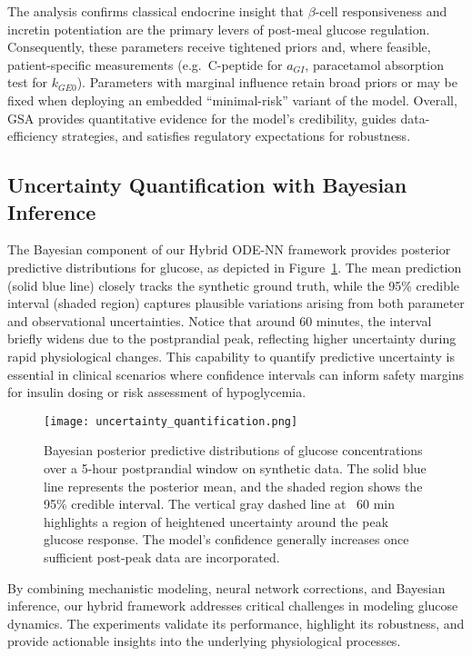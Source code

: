 \documentclass[9pt,shortpaper,twoside,web]{ieeecolor}
\begin{document}
The analysis confirms classical endocrine insight that
$\beta$-cell responsiveness and incretin potentiation are the primary
levers of post-meal glucose regulation.
Consequently, these parameters receive tightened priors and, where
feasible, patient-specific measurements (e.g.\ C-peptide for
$a_{GI}$, paracetamol absorption test for $k_{GE0}$).  
Parameters with marginal influence retain broad priors or may be
fixed when deploying an embedded ``minimal-risk'' variant of the
model.  Overall, GSA provides quantitative evidence for the model's
credibility, guides data-efficiency strategies, and satisfies
regulatory expectations for robustness.


\subsection{Uncertainty Quantification with Bayesian Inference}

The Bayesian component of our Hybrid ODE-NN framework provides posterior predictive distributions for glucose, as depicted in Figure~\ref{fig:uq}. The mean prediction (solid blue line) closely tracks the synthetic ground truth, while the 95\% credible interval (shaded region) captures plausible variations arising from both parameter and observational uncertainties. Notice that around 60 minutes, the interval briefly widens due to the postprandial peak, reflecting higher uncertainty during rapid physiological changes. This capability to quantify predictive uncertainty is essential in clinical scenarios where confidence intervals can inform safety margins for insulin dosing or risk assessment of hypoglycemia.

\begin{figure}[h]
\centering
\texttt{[image: uncertainty\_quantification.png]}
\caption{Bayesian posterior predictive distributions of glucose concentrations over a 5-hour postprandial window on synthetic data. The solid blue line represents the posterior mean, and the shaded region shows the 95\% credible interval. The vertical gray dashed line at ~60 min highlights a region of heightened uncertainty around the peak glucose response. The model's confidence generally increases once sufficient post-peak data are incorporated.}
\label{fig:uq}
\end{figure}

\noindent
By combining mechanistic modeling, neural network corrections, and Bayesian inference, our hybrid framework addresses critical challenges in modeling glucose dynamics. The experiments validate its performance, highlight its robustness, and provide actionable insights into the underlying physiological processes.
\end{document}
